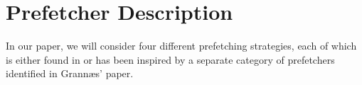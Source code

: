 
\section{Prefetcher Description}
\label{sec:prefetcherDescription}

In our paper, we will consider four different prefetching strategies,
each of which is either found in or has been inspired by a separate
category of prefetchers identified in Grannæs' paper. \cite{Grannas}





